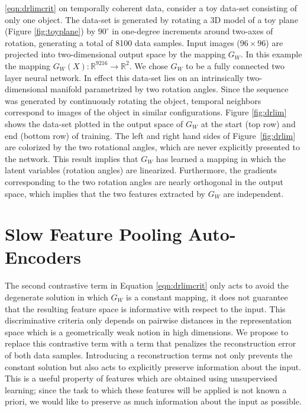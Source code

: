 \ref{eqn:drlimcrit} on temporally coherent data, consider a toy data-set
consisting of only one object. The data-set is generated by rotating a 3D model
of a toy plane (Figure \ref{fig:toyplane}) by $90^{\circ}$ in one-degree
increments around two-axes of rotation, generating a total of 8100 data
samples. Input images ($96 \times 96$) are projected into two-dimensional
output space by the mapping $G_W$. In this example the mapping $G_W(X):
\mathbb{R}^{9216} \to \mathbb{R}^2 $. We chose $G_W$ to be a fully connected
two layer neural network. In effect this data-set lies on an intrinsically
two-dimensional manifold parametrized by two rotation angles. Since the
sequence was generated by continuously rotating the object, temporal neighbors
correspond to images of the object in similar configurations.  Figure
\ref{fig:drlim} shows the data-set plotted in the output space of $G_W$ at the
start (top row) and end (bottom row) of training. The left and right hand sides
of Figure~\ref{fig:drlim} are colorized by the two rotational angles, which are
never explicitly presented to the network. This result implies that $G_W$ has
learned a mapping in which the latent variables (rotation angles) are
linearized. Furthermore, the gradients corresponding to the two rotation angles
are nearly orthogonal in the output space, which implies that the two features
extracted by $G_W$ are independent.  

\section{Slow Feature Pooling Auto-Encoders} \label{sfautoencs} The second
contrastive term in Equation \ref{eqn:drlimcrit} only acts to avoid the
degenerate solution in which $G_W$ is a constant mapping, it does not guarantee
that the resulting feature space is informative with respect to the input.
This discriminative criteria only depends on pairwise distances in the
representation space which is a geometrically weak notion in high dimensions.
We propose to replace this contrastive term with a term that penalizes the
reconstruction error of both data samples.  Introducing a reconstruction terms
not only prevents the constant solution but also acts to explicitly preserve
information about the input.  This is a useful property of features which are
obtained using unsupervised learning; since the task to which these features
will be applied is not known a priori, we would like to preserve as much
information about the input as possible. 

